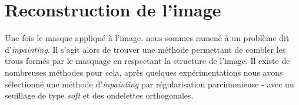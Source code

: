 \section{Reconstruction de l'image}

Une fois le masque appliqué à l'image, nous sommes ramené à un problème dit d'\emph{inpainting}. Il s'agit alors de trouver une méthode permettant de combler les trous formés par le masquage en respectant la structure de l'image. Il existe de nombreuses méthodes pour cela, après quelques expérimentations nous avons sélectionné une méthode d'\emph{inpainting} par régularisation parcimonieuse - avec un seuillage de type \emph{soft} et des ondelettes orthogonales. 




%
%
